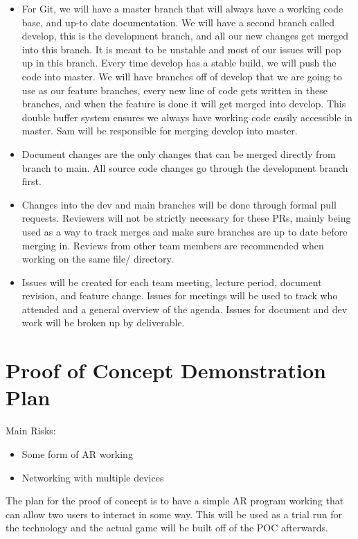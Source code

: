 \documentclass{article}
\begin{document}
\begin{itemize}
	\item For Git, we will have a master branch that will always have a working code base, and up-to date documentation. We will have a second branch called develop, this is the development branch, and all our new changes get merged into this branch. It is meant to be unstable and most of our issues will pop up in this branch. Every time develop has a stable build, we will push the code into master. We will have branches off of develop that we are going to use as our feature branches, every new line of code gets written in these branches, and when the feature is done it will get merged into develop. This double buffer system ensures we always have working code easily accessible in master. Sam will be responsible for merging develop into master. 
 \item Document changes are the only changes that can be merged directly from branch to main. All source code changes go through the development branch first.
    \item Changes into the dev and main branches will be done through formal pull requests. Reviewers will not be strictly necessary for these PRs, mainly being used as a way to track merges and make sure branches are up to date before merging in. Reviews from other team members are recommended when working on the same file/ directory. 
	\item Issues will be created for each team meeting, lecture period, document revision, and feature change. Issues for meetings will be used to track who attended and a general overview of the agenda. Issues for document and dev work will be broken up by deliverable. 
\end{itemize}

\section{Proof of Concept Demonstration Plan}

Main Risks:
\begin{itemize}
    \item Some form of AR working
    \item Networking with multiple devices
\end{itemize}

The plan for the proof of concept is to have a simple AR program working that can allow two users to interact in some way. This will be used as a trial run for the technology and the actual game will be built off of the POC afterwards. 
\end{document}
